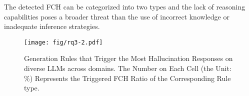 

\begin{tcolorbox}[title=ANSWER to RQ2, boxrule=0.8pt,boxsep=1.5pt,left=2pt,right=2pt,top=2pt,bottom=1pt]
The detected FCH can be categorized into two types and the lack of reasoning capabilities poses a broader threat than the use of incorrect knowledge or inadequate inference strategies. 
\end{tcolorbox} 

\begin{figure}[!b]
\centering\texttt{[image: fig/rq3-2.pdf]}\\
\caption{Generation Rules that Trigger the Most Hallucination Responses on diverse LLMs across domains. The Number on Each Cell (the Unit: \%) Represents the Triggered FCH Ratio of the Corresponding Rule type.}
    \label{fig:rq3}
\end{figure}

